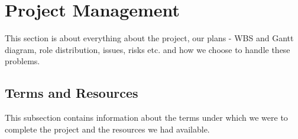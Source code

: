 \section{Project Management}
This section is about everything about the project, our plans - WBS and Gantt diagram, role distribution, issues, risks etc. and how we choose to handle these problems.%

\subsection{Terms and Resources}
This subsection contains information about the terms under which we were to complete the project and the resources we had available.